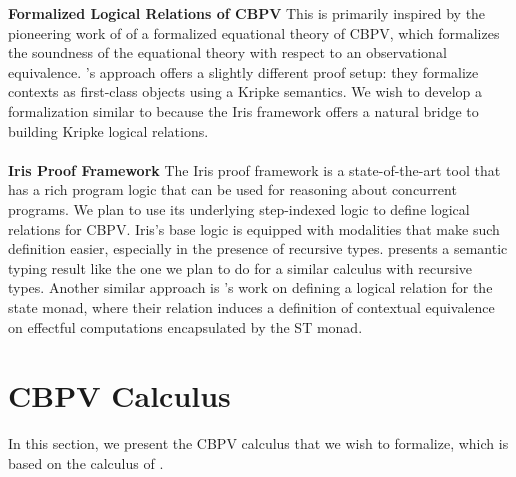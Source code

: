 \documentclass[11pt,twoside]{article}
\begin{document}
\textbf{Formalized Logical Relations of CBPV}
This is primarily inspired by the pioneering work of \citet{rizkallah} of a formalized equational theory of CBPV, which formalizes the soundness of the equational theory with respect to an observational equivalence.
\citet{forster}'s approach offers a slightly different proof setup: they formalize contexts as first-class objects using a Kripke semantics.
We wish to develop a formalization similar to \citet{forster} because the Iris framework offers a natural bridge to building Kripke logical relations.\\
\\
\textbf{Iris Proof Framework}
The Iris proof framework is a state-of-the-art tool that has a rich program logic that can be used for reasoning about concurrent programs.
We plan to use its underlying step-indexed logic to define logical relations for CBPV.
Iris's base logic is equipped with modalities that make such definition easier, especially in the presence of recursive types.
\citet{krebbers2017} presents a semantic typing result like the one we plan to do for a similar calculus with recursive types.
Another similar approach is \citet{timany}'s work on defining a logical relation for the state monad, where their relation induces a definition of contextual equivalence on effectful computations encapsulated by the ST monad.

\section{CBPV Calculus}
In this section, we present the CBPV calculus that we wish to formalize, which is based on the calculus of \citet{forster}.

\newcommand{\sep}{\;|\;}
\end{document}
